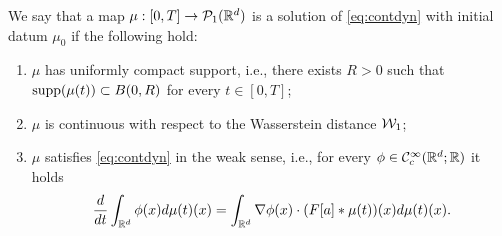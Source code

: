 \begin{definition}
We say that a map $\mu:[0,T]\rightarrow\mathcal{P}_1(\mathbb{R}^d)$ is a solution of \eqref{eq:contdyn} with initial datum $\mu_0$ if the following hold:
\begin{enumerate}
\item $\mu$ has uniformly compact support, i.e., there exists $R > 0$ such that $\operatorname{supp}(\mu(t)) \subset B(0,R)$ for every $t \in [0,T]$;
\item $\mu$ is continuous with respect to the Wasserstein distance $\mathcal{W}_1$;
\item $\mu$ satisfies \eqref{eq:contdyn} in the weak sense, i.e., for every $\phi \in \mathcal{C}^{\infty}_c(\mathbb{R}^d;\mathbb{R})$ it holds
\begin{align*}
\frac{d}{dt} \int_{\mathbb{R}^d} \phi(x) d\mu(t)(x) = \int_{\mathbb{R}^d} \nabla \phi(x) \cdot (F[a]*\mu(t))(x) d\mu(t)(x).
\end{align*}
\end{enumerate}
\end{definition}

